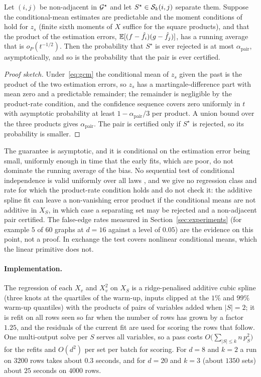 \begin{proposition}\label{prop:np}
Let $(i,j)$ be non-adjacent in $\mathcal{G}^{\star}$ and let $S^\star\in\mathcal{S}_k(i,j)$ separate
them. Suppose the conditional-mean estimates are predictable and the moment
conditions of \citet{waudbysmith2024asymptotic} hold for $z_s$ (finite sixth moments of $X$ suffice for the square products), and that the
product of the estimation errors, $\mathbb{E}[(f-\hat f_i)(g-\hat f_j)]$, has a running
average that is $o_P(t^{-1/2})$. Then the probability that $S^\star$ is ever rejected is at most
$\alpha_{\mathrm{pair}}$, asymptotically, and so is the probability that
the pair is ever certified.
\end{proposition}

\begin{proof}[Proof sketch]
Under~\eqref{eq:gcm} the conditional mean of $z_s$ given the past is the product
of the two estimation errors, so $z_s$ has a martingale-difference part with mean
zero and a predictable remainder; the remainder is negligible by the
product-rate condition, and the confidence sequence covers zero uniformly in $t$
with asymptotic probability at least $1-\alpha_{\mathrm{pair}}/3$ per product. A union bound over the three products gives
$\alpha_{\mathrm{pair}}$. The pair is certified only if $S^\star$ is rejected, so its
probability is smaller.
\end{proof}

\noindent The guarantee is asymptotic, and it is conditional on the estimation
error being small, uniformly enough in time that the early fits, which are poor,
do not dominate the running average of the bias. No sequential test of conditional
independence is valid uniformly over all laws \citep{shah2020hardness}, and we give
no regression class and rate for which the product-rate condition holds and do not
check it: the additive spline fit can leave a non-vanishing error product if the
conditional means are not additive in $X_S$, in which case a separating set may be
rejected and a non-adjacent pair certified. The false-edge rates measured in
Section~\ref{sec:experiments} (for example $5$ of $60$ graphs at $d=16$ against a
level of $0.05$) are the evidence on this point, not a proof. In exchange the test
covers nonlinear conditional means, which the linear primitive does not.

\paragraph{Implementation.} The regression of each $X_v$ and $X_v^2$ on $X_S$ is a
ridge-penalised additive cubic spline (three knots at the quartiles of the
warm-up, inputs clipped at the $1\%$ and $99\%$ warm-up quantiles) with
the products of pairs of variables added when $|S|=2$; it is refit on all rows
seen so far when the number of rows has grown by a factor $1.25$, and the
residuals of the current fit are used for scoring the rows that follow. One
multi-output solve per $S$ serves all variables, so a pass costs
$O\bigl(\sum_{|S|\le k}n\,p_S^2\bigr)$ for the refits and $O(d^2)$ per set per
batch for scoring. For $d=8$ and $k=2$ a run on $3200$ rows takes about $0.3$
seconds, and for $d=20$ and $k=3$ (about $1350$ sets) about $25$ seconds on
$4000$ rows.

